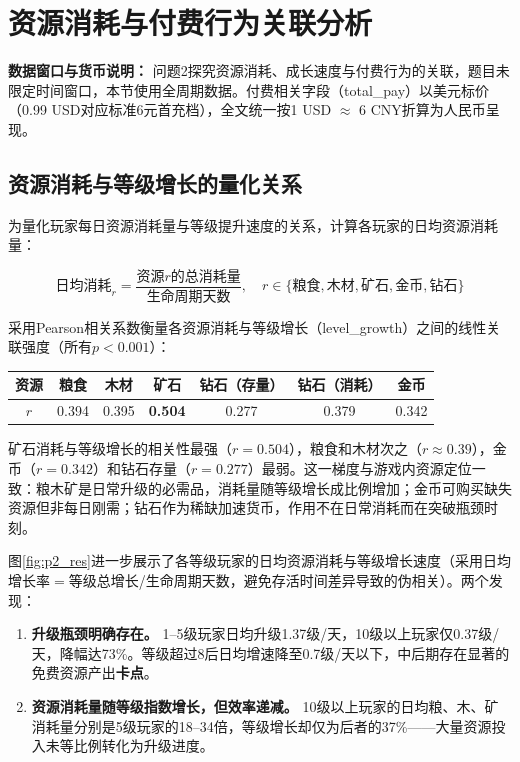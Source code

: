 \section{资源消耗与付费行为关联分析}

\textbf{数据窗口与货币说明：} 问题2探究资源消耗、成长速度与付费行为的关联，题目未限定时间窗口，本节使用全周期数据。付费相关字段（total\_pay）以美元标价（0.99 USD对应标准6元首充档），全文统一按1 USD $\approx$ 6 CNY折算为人民币呈现。

\subsection{资源消耗与等级增长的量化关系}

为量化玩家每日资源消耗量与等级提升速度的关系，计算各玩家的日均资源消耗量：

\begin{equation}
\text{日均消耗}_r = \frac{\text{资源}r\text{的总消耗量}}{\text{生命周期天数}},\quad r \in \{\text{粮食},\text{木材},\text{矿石},\text{金币},\text{钻石}\}
\end{equation}

采用Pearson相关系数衡量各资源消耗与等级增长（level\_growth）之间的线性关联强度（所有$p < 0.001$）：

\begin{center}
\begin{tabular}{c|c|c|c|c|c|c}
\toprule
\textbf{资源} & 粮食 & 木材 & \textbf{矿石} & 钻石（存量） & 钻石（消耗） & 金币 \\
\midrule
$r$ & 0.394 & 0.395 & \textbf{0.504} & 0.277 & 0.379 & 0.342 \\
\bottomrule
\end{tabular}
\end{center}

矿石消耗与等级增长的相关性最强（$r=0.504$），粮食和木材次之（$r\approx0.39$），金币（$r=0.342$）和钻石存量（$r=0.277$）最弱。这一梯度与游戏内资源定位一致：粮木矿是日常升级的必需品，消耗量随等级增长成比例增加；金币可购买缺失资源但非每日刚需；钻石作为稀缺加速货币，作用不在日常消耗而在突破瓶颈时刻。

图\ref{fig:p2_res}进一步展示了各等级玩家的日均资源消耗与等级增长速度（采用日均增长率$=$等级总增长/生命周期天数，避免存活时间差异导致的伪相关）。两个发现：

\begin{enumerate}
    \item \textbf{升级瓶颈明确存在。} 1--5级玩家日均升级1.37级/天，10级以上玩家仅0.37级/天，降幅达73\%。等级超过8后日均增速降至0.7级/天以下，中后期存在显著的免费资源产出\textbf{卡点}。
    \item \textbf{资源消耗量随等级指数增长，但效率递减。} 10级以上玩家的日均粮、木、矿消耗量分别是5级玩家的18--34倍，等级增长却仅为后者的37\%——大量资源投入未等比例转化为升级进度。
\end{enumerate}


